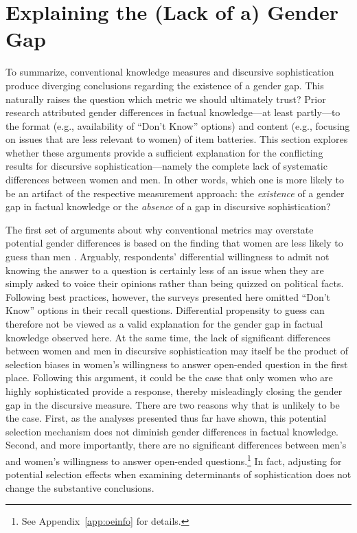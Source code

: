 \section*{Explaining the (Lack of a) Gender Gap}

To summarize, conventional knowledge measures and discursive sophistication produce diverging conclusions regarding the existence of a gender gap. This naturally raises the question which metric we should ultimately trust? Prior research attributed gender differences in factual knowledge---at least partly---to the format (e.g., availability of ``Don't Know'' options) and content (e.g., focusing on issues that are less relevant to women) of item batteries. This section explores whether these arguments provide a sufficient explanation for the conflicting results for discursive sophistication---namely the complete lack of systematic differences between women and men. In other words, which one is more likely to be an artifact of the respective measurement approach: the \textit{existence} of a gender gap in factual knowledge or the \textit{absence} of a gap in discursive sophistication?

The first set of arguments about why conventional metrics may overstate potential gender differences is based on the finding that women are less likely to guess than men \citep{mondak2004knowledge}. Arguably, respondents' differential willingness to admit not knowing the answer to a question is certainly less of an issue when they are simply asked to voice their opinions rather than being quizzed on political facts. Following best practices, however, the surveys presented here omitted ``Don't Know'' options in their recall questions. Differential propensity to guess can therefore not be viewed as a valid explanation for the gender gap in factual knowledge observed here. At the same time, the lack of significant differences between women and men in discursive sophistication may itself be the product of selection biases in women's willingness to answer open-ended question in the first place. Following this argument, it could be the case that only women who are highly sophisticated provide a response, thereby misleadingly closing the gender gap in the discursive measure. There are two reasons why that is unlikely to be the case. First, as the analyses presented thus far have shown, this potential selection mechanism does not diminish gender differences in factual knowledge. Second, and more importantly, there are no significant differences between men's and women's willingness to answer open-ended questions.\footnote{See Appendix~\ref{app:oeinfo} for details.} In fact, adjusting for potential selection effects when examining determinants of sophistication does not change the substantive conclusions.

